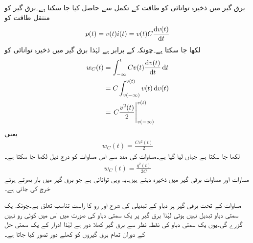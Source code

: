 برق گیر میں ذخیرہ توانائی  کو طاقت کے تکمل سے حاصل کیا جا سکتا ہے۔برق گیر کو منتقل طاقت  کو
\begin{align}\label{مساوات_امالہ_طاقت_برق_گیر}
p(t)=v(t)i(t)=v(t) C \frac{\dif v(t)}{\dif t}
\end{align}
لکھا جا سکتا ہے۔چونکہ  کے برابر ہے  لہٰذا برق گیر میں ذخیرہ توانائی کو
\begin{align*}
w_C(t)&=\int_{-\infty}^{t} C v(t) \frac{\dif v(t)}{\dif t} \dif t\\
&=C\int_{v(-\infty)}^{v(t)} v(t) \dif v(t)\\
&=\left. C \frac{v^2(t)}{2} \right|_{v(-\infty)}^{v(t)}
\end{align*}
یعنی
\begin{align}\label{مسوات_امالہ_توانائی_برق_گیر_الف}
w_C(t)=\frac{C v^2(t)}{2}
\end{align}
لکھا جا سکتا ہے جہاں  لیا گیا ہے۔مساوات  کی مدد سے اس مساوات کو درج ذیل لکھا جا سکتا ہے۔
\begin{align}\label{مسوات_امالہ_توانائی_برق_گیر_ب}
w_C(t)=\frac{q^2(t)}{2C}
\end{align}
مساوات  اور مساوات  برقی گیر میں ذخیرہ  دیتے ہیں۔یہ وہی توانائی ہے جو برق گیر میں بار بھرتے ہوئے خرچ کی جاتی ہے۔

مساوات  کے تحت برقی گیر پر دباو کے تبدیلی کی شرح اور رو کا راست تناسب تعلق ہے۔چونکہ یک سمتی دباو تبدیل نہیں ہوتی لہٰذا برق گیر پر یک سمتی دباو کی صورت میں اس میں کوئی رو نہیں گزرے گی۔یوں یک سمتی دباو کی نقطہ نظر سے برق گیر کھلا دور ہے لہٰذا ادوار کے یک سمتی حل کے دوران تمام برق گیروں کو کھلے دور تصور کیا جاتا ہے۔

